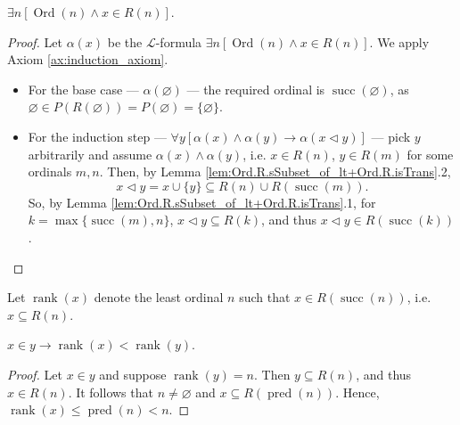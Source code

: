 \begin{theorem}
    \label{thm:forall_exists_ord_mem_R}
    $\exists n [\operatorname{Ord}(n) \land x \in R(n)]$.
\end{theorem}

\begin{proof}
    Let $\alpha (x)$ be the $\mathcal{L}$-formula 
    $\exists n [\operatorname{Ord}(n) \land x \in R(n)]$.
    We apply Axiom \ref{ax:induction_axiom}.
    \begin{itemize}
        \item For the base case — $\alpha (\varnothing)$ — the required ordinal is 
        $\operatorname{succ}(\varnothing)$, as $\varnothing \in P(R(\varnothing)) = P(\varnothing)
        = \{\varnothing\}$.
        \item For the induction step 
        — $\forall y[\alpha(x) \land \alpha(y) \rightarrow \alpha(x \lhd y)]$ — 
        pick $y$ arbitrarily and assume $\alpha(x) \land \alpha(y)$, i.e. $x \in R(n)$, 
        $y \in R(m)$ for some ordinals $m,n$. 
        Then, by Lemma \ref{lem:Ord.R.sSubset_of_lt+Ord.R.isTrans}.2,
        $$
        x \lhd y = x \cup \{y\} \subseteq R(n) \cup R(\operatorname{succ}(m)).
        $$
        So, by Lemma \ref{lem:Ord.R.sSubset_of_lt+Ord.R.isTrans}.1, 
        for $k=\max \{\operatorname{succ}(m), n\}$, $x\lhd y \subseteq R(k)$, and thus
        $x \lhd y \in R(\operatorname{succ}(k))$.
    \end{itemize}
\end{proof}

\begin{definition}
    \label{def:rank}
    Let $\operatorname{rank}(x)$ denote the least ordinal $n$ such that 
    $x \in R(\operatorname{succ}(n))$, i.e. $x \subseteq R(n)$.
\end{definition}

\begin{theorem}
    \label{thm:rank.lt_of_mem}
    $x \in y \rightarrow \operatorname{rank}(x) < \operatorname{rank}(y)$.
\end{theorem}

\begin{proof}
    Let $x \in y$ and suppose $\operatorname{rank}(y)=n$.
    Then $y \subseteq R(n)$, and thus $x \in R(n)$.
    It follows that $n \neq \varnothing$ and $x \subseteq R(\operatorname{pred}(n))$.
    Hence, $\operatorname{rank}(x) \leq \operatorname{pred}(n) < n$.
\end{proof}

